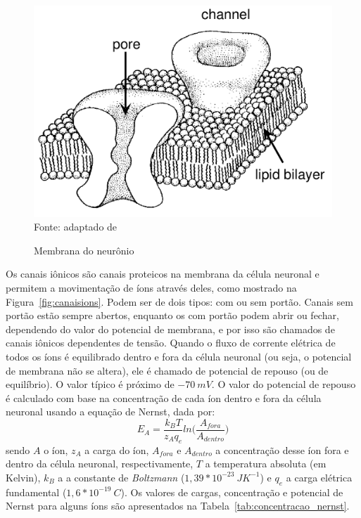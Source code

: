 \begin{figure}[tb]
	\centering
	\caption[Membrana do neurônio]{Membrana do neurônio}
	\includegraphics[width=0.55\linewidth]{figs/membrana_neuronio}
	\label{fig:membrananeuronio}
	\\
	Fonte: adaptado de \cite{hille_ionic_1992}
\end{figure}

Os canais iônicos são canais proteicos na membrana da célula neuronal e permitem a movimentação de íons através deles, como mostrado na Figura~\ref{fig:canaisions}. Podem ser de dois tipos: com ou sem portão. Canais sem portão estão sempre abertos, enquanto os com portão podem abrir ou fechar, dependendo do valor do potencial de membrana, e por isso são chamados de canais iônicos dependentes de tensão. Quando o fluxo de corrente elétrica de todos os íons é equilibrado dentro e fora da célula neuronal (ou seja, o potencial de membrana não se altera), ele é chamado de potencial de repouso (ou de equilíbrio). O valor típico é próximo de $-70\ mV$. O valor do potencial de repouso é calculado com base na concentração de cada íon dentro e fora da célula neuronal usando a equação de Nernst, dada por:
\begin{equation}\label{eq:nernst}
E_A=\frac{k_BT}{z_Aq_e}ln\Big(\frac{A_{fora}}{A_{dentro}}\Big)
\end{equation}
sendo $A$ o íon, $z_A$ a carga do íon, $A_{fora}$ e $A_{dentro}$ a concentração desse íon fora e dentro da célula neuronal, respectivamente, $T$ a temperatura absoluta (em Kelvin), $k_B$ a a constante de \textit{Boltzmann} ($1,39*10^{-23}\ JK^{-1}$) e $q_e$ a carga elétrica fundamental ($1,6*10^{-19}\ C$). Os valores de cargas, concentração e potencial de Nernst para alguns íons são apresentados na Tabela~\ref{tab:concentracao_nernst}.

